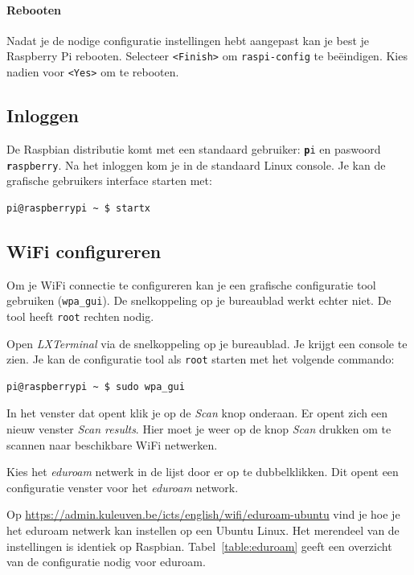 \documentclass[a4paper]{article}
\begin{document}
      \paragraph{Rebooten}  Nadat je de nodige configuratie
instellingen hebt aangepast kan je best je Raspberry Pi rebooten.
Selecteer \texttt{<Finish>} om \texttt{raspi-config} te be\"eindigen.
Kies nadien voor \texttt{<Yes>} om te rebooten.

    \subsection{Inloggen}\label{sec:inloggen}

      De Raspbian distributie komt met een standaard gebruiker:
\texttt{\textbf pi} en paswoord \texttt{\textbf raspberry}.  Na het inloggen kom je in
de standaard Linux console.  Je kan de grafische gebruikers interface
starten met:

\begin{lstlisting}
pi@raspberrypi ~ $ startx
\end{lstlisting}

    \subsection{WiFi configureren}

      Om je WiFi connectie te configureren kan je een grafische
configuratie tool gebruiken (\texttt{wpa\_gui}).  De snelkoppeling op je bureaublad werkt
echter niet.  De tool heeft \texttt{root} rechten nodig.

      Open \emph{LXTerminal} via de snelkoppeling op je bureaublad.  Je
krijgt een console te zien.  Je kan de configuratie tool als
\texttt{root} starten met het volgende commando:

\begin{lstlisting}
pi@raspberrypi ~ $ sudo wpa_gui
\end{lstlisting}

    In het venster dat opent klik je op de \emph{Scan} knop onderaan.
Er opent zich een nieuw venster \emph{Scan results}.  Hier moet je
weer op de knop \emph{Scan} drukken om te scannen naar beschikbare
WiFi netwerken.

    Kies het \emph{eduroam} netwerk in de lijst door er op te
dubbelklikken.  Dit opent een configuratie venster voor het
\emph{eduroam} network.

Op \url{https://admin.kuleuven.be/icts/english/wifi/eduroam-ubuntu} vind
je hoe je het eduroam netwerk kan instellen op een Ubuntu Linux.  Het
merendeel van de instellingen is identiek op Raspbian.
Tabel~\ref{table:eduroam} geeft een overzicht van de configuratie
nodig voor eduroam.
\end{document}
